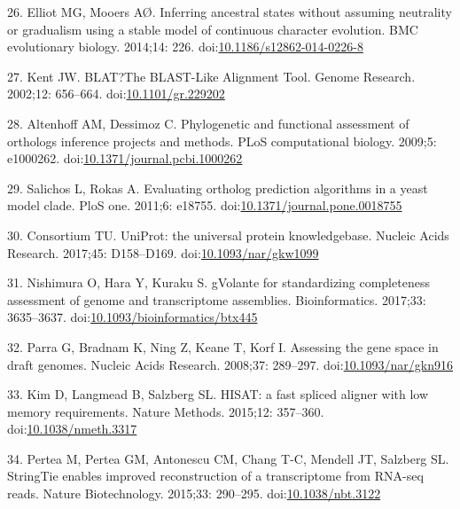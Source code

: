 \documentclass[]{elsarticle} %
\begin{document}
\leavevmode\hypertarget{ref-ElliotAndMooers2014}{}%
26. Elliot MG, Mooers AØ. Inferring ancestral states without assuming
neutrality or gradualism using a stable model of continuous character
evolution. BMC evolutionary biology. 2014;14: 226.
doi:\href{https://doi.org/10.1186/s12862-014-0226-8}{10.1186/s12862-014-0226-8}

\leavevmode\hypertarget{ref-blat}{}%
27. Kent JW. BLAT?The BLAST-Like Alignment Tool. Genome Research.
2002;12: 656--664.
doi:\href{https://doi.org/10.1101/gr.229202}{10.1101/gr.229202}

\leavevmode\hypertarget{ref-AltenhoffAndDessimoz2009}{}%
28. Altenhoff AM, Dessimoz C. Phylogenetic and functional assessment of
orthologs inference projects and methods. PLoS computational biology.
2009;5: e1000262.
doi:\href{https://doi.org/10.1371/journal.pcbi.1000262}{10.1371/journal.pcbi.1000262}

\leavevmode\hypertarget{ref-SalichosAndRokas2011}{}%
29. Salichos L, Rokas A. Evaluating ortholog prediction algorithms in a
yeast model clade. PloS one. 2011;6: e18755.
doi:\href{https://doi.org/10.1371/journal.pone.0018755}{10.1371/journal.pone.0018755}

\leavevmode\hypertarget{ref-uniprot}{}%
30. Consortium TU. UniProt: the universal protein knowledgebase. Nucleic
Acids Research. 2017;45: D158--D169.
doi:\href{https://doi.org/10.1093/nar/gkw1099}{10.1093/nar/gkw1099}

\leavevmode\hypertarget{ref-gVolante}{}%
31. Nishimura O, Hara Y, Kuraku S. gVolante for standardizing
completeness assessment of genome and transcriptome assemblies.
Bioinformatics. 2017;33: 3635--3637.
doi:\href{https://doi.org/10.1093/bioinformatics/btx445}{10.1093/bioinformatics/btx445}

\leavevmode\hypertarget{ref-CEGMA}{}%
32. Parra G, Bradnam K, Ning Z, Keane T, Korf I. Assessing the gene
space in draft genomes. Nucleic Acids Research. 2008;37: 289--297.
doi:\href{https://doi.org/10.1093/nar/gkn916}{10.1093/nar/gkn916}

\leavevmode\hypertarget{ref-HISAT}{}%
33. Kim D, Langmead B, Salzberg SL. HISAT: a fast spliced aligner with
low memory requirements. Nature Methods. 2015;12: 357--360.
doi:\href{https://doi.org/10.1038/nmeth.3317}{10.1038/nmeth.3317}

\leavevmode\hypertarget{ref-StringTie}{}%
34. Pertea M, Pertea GM, Antonescu CM, Chang T-C, Mendell JT, Salzberg
SL. StringTie enables improved reconstruction of a transcriptome from
RNA-seq reads. Nature Biotechnology. 2015;33: 290--295.
doi:\href{https://doi.org/10.1038/nbt.3122}{10.1038/nbt.3122}
\end{document}
